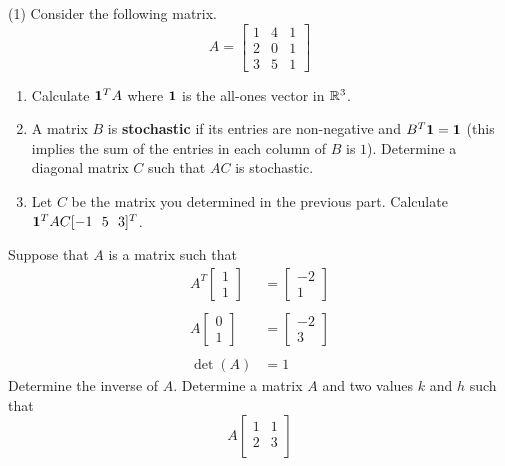 \begin{tasks}[resume, style=enumerate](1)
\task
  Consider the following matrix.
  \begin{displaymath}
    A =
    \begin{bmatrix}
      1 & 4 & 1 \\
      2 & 0 & 1 \\
      3 & 5 & 1
    \end{bmatrix}
  \end{displaymath}
  \begin{enumerate}[label=(\alph*)]
  \item
    Calculate $\mathbf 1^T A$ where $\mathbf 1$ is the all-ones vector in
    $\mathbb R^3$.
  \item
    A matrix $B$ is \textbf{stochastic} if its entries are
    non-negative and $B^T \mathbf 1 = \mathbf 1$ (this implies the sum of the
    entries in each column of $B$ is $1$).  Determine a diagonal
    matrix $C$ such that $AC$ is stochastic.
  \item
    Let $C$ be the matrix you determined in the previous part.
    Calculate $\mathbf 1^T A C [{-1} \ \ 5 \ \ 3]^T$.
  \end{enumerate}
\task
  Suppose that $A$ is a matrix such that
  \begin{align*}
    A^T
    \begin{bmatrix}
      1 \\ 1
    \end{bmatrix}
    &=
    \begin{bmatrix}
      -2 \\ 1
    \end{bmatrix}
    \\
    \\
    A
    \begin{bmatrix}
      0 \\ 1
    \end{bmatrix}
    &=
    \begin{bmatrix}
      -2 \\ 3
    \end{bmatrix}
    \\
    \\
    \det(A) &= 1
  \end{align*}
  Determine the inverse of $A$.
\task
  Determine a matrix $A$ and two values $k$ and $h$ such that
  \begin{displaymath}
    A
    \begin{bmatrix}
      1 & 1 \\
      2 & 3 \\

\end{bmatrix}
\end{displaymath}
\end{tasks}

